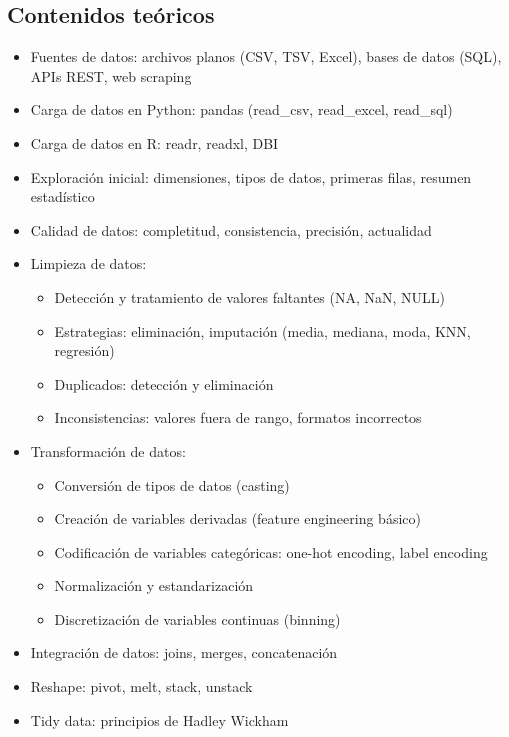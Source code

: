 \documentclass[a4paper,11pt]{article}
\begin{document}
\subsection{Contenidos teóricos}
\begin{itemize}[leftmargin=*]
    \item Fuentes de datos: archivos planos (CSV, TSV, Excel), bases de datos (SQL), APIs REST, web scraping
    \item Carga de datos en Python: pandas (read\_csv, read\_excel, read\_sql)
    \item Carga de datos en R: readr, readxl, DBI
    \item Exploración inicial: dimensiones, tipos de datos, primeras filas, resumen estadístico
    \item Calidad de datos: completitud, consistencia, precisión, actualidad
    \item Limpieza de datos:
    \begin{itemize}
        \item Detección y tratamiento de valores faltantes (NA, NaN, NULL)
        \item Estrategias: eliminación, imputación (media, mediana, moda, KNN, regresión)
        \item Duplicados: detección y eliminación
        \item Inconsistencias: valores fuera de rango, formatos incorrectos
    \end{itemize}
    \item Transformación de datos:
    \begin{itemize}
        \item Conversión de tipos de datos (casting)
        \item Creación de variables derivadas (feature engineering básico)
        \item Codificación de variables categóricas: one-hot encoding, label encoding
        \item Normalización y estandarización
        \item Discretización de variables continuas (binning)
    \end{itemize}
    \item Integración de datos: joins, merges, concatenación
    \item Reshape: pivot, melt, stack, unstack
    \item Tidy data: principios de Hadley Wickham
\end{itemize}
\end{document}
